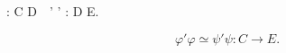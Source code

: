 ~\varphi \simeq \psi : C \rightarrow D~~\varphi' \simeq \psi' : D \rightarrow E.~

$$\varphi' \varphi \simeq \psi' \psi : C \rightarrow E.$$
